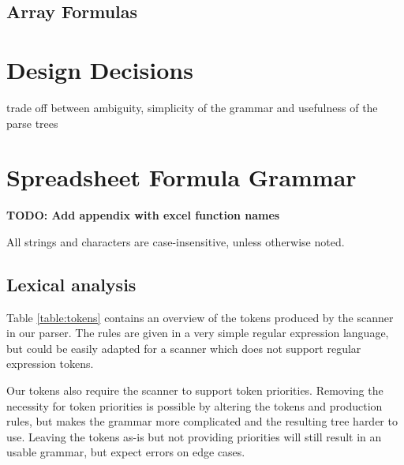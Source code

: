 \documentclass[conference]{IEEEtran}
\newcommand{\todo}[1]{\textbf{TODO: #1}}
\begin{document}
\subsection{Array Formulas}

\section{Design Decisions}
trade off between ambiguity, simplicity of the grammar and usefulness of the parse trees

\section{Spreadsheet Formula Grammar}

\todo{Add appendix with excel function names}

All strings and characters are case-insensitive, unless otherwise noted.

\subsection{Lexical analysis}

Table \ref{table:tokens} contains an overview of the tokens produced by the scanner in our parser. The rules are given in a very simple regular expression language, but could be easily adapted for a scanner which does not support regular expression tokens. 

Our tokens also require the scanner to support token priorities. Removing the necessity for token priorities is possible by altering the tokens and production rules, but makes the grammar more complicated and the resulting tree harder to use. Leaving the tokens as-is but not providing priorities will still result in an usable grammar, but expect errors on edge cases.
\end{document}
